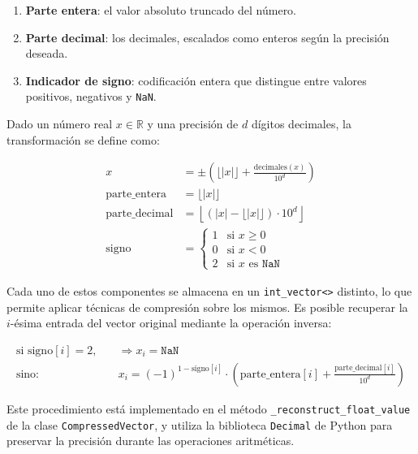 \begin{enumerate}
    \item \textbf{Parte entera}: el valor absoluto truncado del número.
    \item \textbf{Parte decimal}: los decimales, escalados como enteros según la precisión deseada.
    \item \textbf{Indicador de signo}: codificación entera que distingue entre valores positivos, negativos y \texttt{NaN}.
\end{enumerate}

Dado un número real $x \in \mathbb{R}$ y una precisión de $d$ dígitos decimales, la transformación se define como:

\begin{align*}
    x &= \pm \left( \lfloor |x| \rfloor + \frac{\mathrm{decimales}(x)}{10^d} \right) \\
    \text{parte\_entera} &= \lfloor |x| \rfloor \\
    \text{parte\_decimal} &= \left\lfloor (|x| - \lfloor |x| \rfloor) \cdot 10^d \right\rfloor \\
    \text{signo} &=
        \begin{cases}
            1 & \text{si } x \geq 0 \\
            0 & \text{si } x < 0 \\
            2 & \text{si } x \text{ es } \texttt{NaN}
        \end{cases}
\end{align*}

Cada uno de estos componentes se almacena en un \texttt{int\_vector<>} distinto, lo que permite aplicar técnicas de compresión sobre los mismos.
\vspace{1em}
\noindent
Es posible recuperar la $i$-ésima entrada del vector original mediante la operación inversa:

\begin{align*}
    \text{si } \text{signo}[i] = 2, \quad &\Rightarrow x_i = \texttt{NaN} \\
    \text{sino: } \quad &x_i = (-1)^{1 - \text{signo}[i]} \cdot \left( \text{parte\_entera}[i] + \frac{\text{parte\_decimal}[i]}{10^d} \right)
\end{align*}

\noindent
Este procedimiento está implementado en el método \texttt{\_reconstruct\_float\_value} de la clase \texttt{CompressedVector}, y utiliza la biblioteca \texttt{Decimal} de Python para preservar la precisión durante las operaciones aritméticas.

